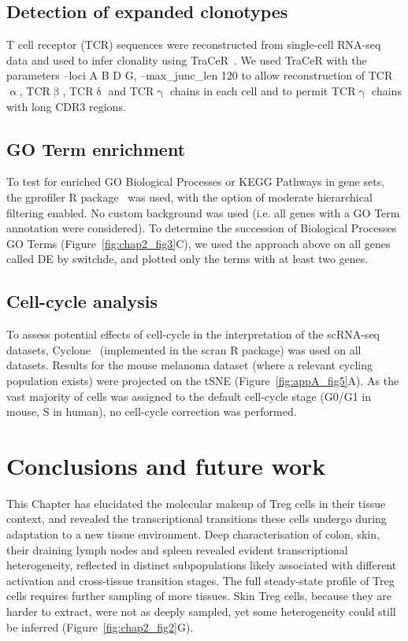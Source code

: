 \subsection{Detection of expanded clonotypes}
T cell receptor (TCR) sequences were reconstructed from single-cell RNA-seq data and used to infer clonality using TraCeR~\citep{stubbington_t_2016}. We used TraCeR with the parameters --loci A B D G, --max\_junc\_len 120 to allow reconstruction of TCR${\upalpha}$, TCR${\upbeta}$, TCR${\updelta}$ and TCR${\upgamma}$ chains in each cell and to permit TCR${\upgamma}$ chains with long CDR3 regions. 

\subsection{GO Term enrichment}
To test for enriched GO Biological Processes or KEGG Pathways in gene sets, the gprofiler R package~\citep{Reimand2016-fj} was used, with the option of moderate hierarchical filtering enabled. No custom background was used (i.e. all genes with a GO Term annotation were considered).
To determine the succession of Biological Processes GO Terms (Figure~\ref{fig:chap2_fig3}C), we used the approach above on all genes called DE by switchde, and plotted only the terms with at least two genes.

\subsection{Cell-cycle analysis}
To assess potential effects of cell-cycle in the interpretation of the scRNA-seq datasets, Cyclone~\citep{Scialdone2015-tw} (implemented in the scran R package) was used on all datasets. Results for the mouse melanoma dataset (where a relevant cycling population exists) were projected on the tSNE (Figure~\ref{fig:appA_fig5}A). As the vast majority of cells was assigned to the default cell-cycle stage (G0/G1 in mouse, S in human), no cell-cycle correction was performed.


\section{Conclusions and future work}
\label{section_2.conc}

This Chapter has elucidated the molecular makeup of Treg cells in their tissue context, and revealed the transcriptional transitions these cells undergo during  adaptation to a new tissue environment. Deep characterisation of colon, skin, their draining lymph nodes and spleen revealed evident transcriptional heterogeneity, reflected in distinct subpopulations likely associated with different activation and cross-tissue transition stages. The full steady-state profile of Treg cells requires further sampling of more tissues. Skin Treg cells, because they are harder to extract, were not as deeply sampled, yet some heterogeneity could still be inferred (Figure~\ref{fig:chap2_fig2}G).


